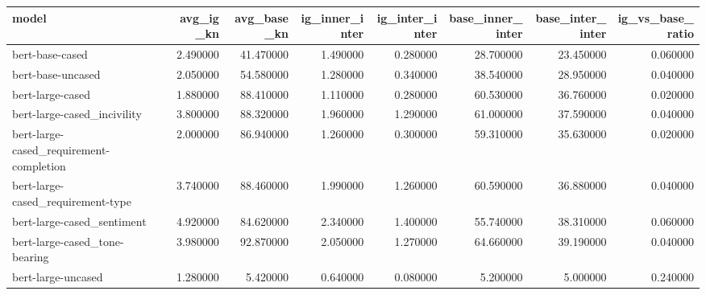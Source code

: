 \begin{tabular}{lrrrrrrr}
\toprule
model & avg_ig_kn & avg_base_kn & ig_inner_inter & ig_inter_inter & base_inner_inter & base_inter_inter & ig_vs_base_ratio \\
\midrule
bert-base-cased & 2.490000 & 41.470000 & 1.490000 & 0.280000 & 28.700000 & 23.450000 & 0.060000 \\
bert-base-uncased & 2.050000 & 54.580000 & 1.280000 & 0.340000 & 38.540000 & 28.950000 & 0.040000 \\
bert-large-cased & 1.880000 & 88.410000 & 1.110000 & 0.280000 & 60.530000 & 36.760000 & 0.020000 \\
bert-large-cased_incivility & 3.800000 & 88.320000 & 1.960000 & 1.290000 & 61.000000 & 37.590000 & 0.040000 \\
bert-large-cased_requirement-completion & 2.000000 & 86.940000 & 1.260000 & 0.300000 & 59.310000 & 35.630000 & 0.020000 \\
bert-large-cased_requirement-type & 3.740000 & 88.460000 & 1.990000 & 1.260000 & 60.590000 & 36.880000 & 0.040000 \\
bert-large-cased_sentiment & 4.920000 & 84.620000 & 2.340000 & 1.400000 & 55.740000 & 38.310000 & 0.060000 \\
bert-large-cased_tone-bearing & 3.980000 & 92.870000 & 2.050000 & 1.270000 & 64.660000 & 39.190000 & 0.040000 \\
bert-large-uncased & 1.280000 & 5.420000 & 0.640000 & 0.080000 & 5.200000 & 5.000000 & 0.240000 \\
\bottomrule
\end{tabular}
